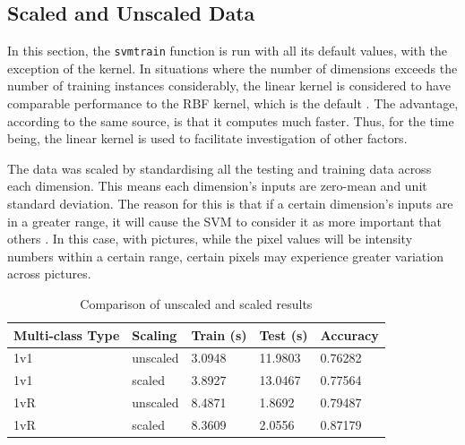 \documentclass[a4paper, 10pt, conference]{ieeeconf}
\begin{document}
\subsection{Scaled and Unscaled Data}



In this section, the \texttt{svmtrain} function is run with all its default values, with the exception of the kernel. In situations where the number of dimensions exceeds the number of training instances considerably, the linear kernel is considered to have comparable performance to the RBF kernel, which is the default \cite{linear}. The advantage, according to the same source, is that it computes much faster. Thus, for the time being, the linear kernel is used to facilitate investigation of other factors.

The data was scaled by standardising all the testing and training data across each dimension. This means each dimension's inputs are zero-mean and unit standard deviation. The reason for this is that if a certain dimension's inputs are in a greater range, it will cause the SVM to consider it as more important that others \cite{scale} \cite{linear}. In this case, with pictures, while the pixel values will be intensity numbers within a certain range, certain pixels may experience greater variation across pictures.

\begin{table}[!ht]
\centering
\caption{Comparison of unscaled and scaled results} \label{tbl:scaling}
\begin{tabular}{lllll}
\textbf{Multi-class Type} & \textbf{Scaling} & \textbf{Train (s)} & \textbf{Test (s)} & \textbf{Accuracy}\\ \hline
1v1 & unscaled & 3.0948 & 11.9803 & 0.76282\\ \hline
1v1 & scaled & 3.8927 & 13.0467 & 0.77564\\ \hline
1vR & unscaled & 8.4871 & 1.8692 & 0.79487\\ \hline
1vR & scaled & 8.3609 & 2.0556 & 0.87179\\ \hline
\end{tabular}
\end{table}
\end{document}
